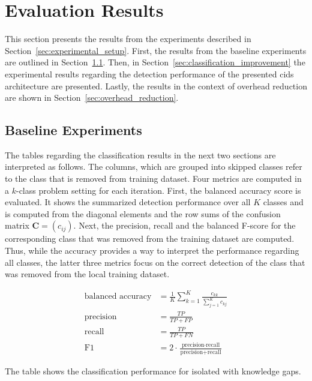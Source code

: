 \documentclass[../../main.tex]{subfiles}
\begin{document}
\section{Evaluation Results}

This section presents the results from the experiments described in Section~\ref{sec:experimental_setup}. First, the results from the baseline experiments are outlined in Section~\ref{sec:baseline}. Then, in Section~\ref{sec:classification_improvement} the experimental results regarding the detection performance of the presented \gls{cids} architecture are presented. Lastly, the results in the context of overhead reduction are shown in Section~\ref{sec:overhead_reduction}.

\subsection{Baseline Experiments}\label{sec:baseline}

The tables regarding the classification results in the next two sections are interpreted as follows. The columns, which are grouped into skipped classes refer to the class that is removed from training dataset. Four metrics are computed in a $k$-class problem setting for each iteration. First, the balanced accuracy score is evaluated. It shows the summarized detection performance over all $K$ classes and is computed from the diagonal elements and the row sums of the confusion matrix $\mathbf{C} = (c_{ij})$. Next, the precision, recall and the balanced F-score for the corresponding class that was removed from the training dataset are computed. Thus, while the accuracy provides a way to interpret the performance regarding all classes, the latter three metrics focus on the correct detection of the class that was removed from the local training dataset.

\begin{align*}
    \text{balanced accuracy} &= \frac{1}{K} \sum\limits_{k=1}^K \frac{c_{kk}}{\sum_{j=1}^K c_{kj}} \\
    \text{precision} &= \frac{TP}{TP + FP} \\
    \text{recall} &= \frac{TP}{TP + FN} \\
    \text{F1} &= 2 \cdot \frac{\text{precision} \cdot \text{recall}}{\text{precision} + \text{recall}}
\end{align*}

\begin{table}[H]
    \footnotesize
    \centering
    \setlength{\extrarowheight}{0pt}
    \addtolength{\extrarowheight}{\aboverulesep}
    \addtolength{\extrarowheight}{\belowrulesep}
    \addtolength{\tabcolsep}{-0.4em}
    \setlength{\aboverulesep}{0pt}
    \setlength{\belowrulesep}{0pt}
    \setlength{\extrarowheight}{.1em}
     
    \caption[Baseline Detection Performance With Missing Class Information]{The table shows the classification performance for isolated  with knowledge gaps.}
    \label{tab:missing_classes}
\end{table}
\end{document}
